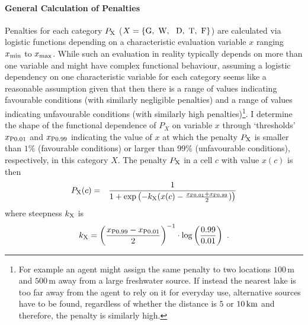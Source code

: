 \paragraph{General Calculation of Penalties}
Penalties for each category $P_{\rm X}$ ($X=\{\text{G,\, W, \, D,\, T,\, F}\}$) are calculated via logistic functions depending on a characteristic evaluation variable $x$ ranging $x_{\rm min}$ to $x_{\rm max}$.
While such an evaluation in reality typically depends on more than one variable and might have complex functional behaviour, assuming a logistic dependency on one characteristic variable for each category seems like a reasonable assumption given that then there is a range of values indicating favourable conditions (with similarly negligible penalties) and a range of values indicating unfavourable conditions (with similarly high penalties)\footnote{For example an agent might assign the same penalty to two locations $100\, \text{m}$ and $500\, \text{m}$ away from a large freshwater source. If instead the nearest lake is too far away from the agent to rely on it for everyday use, alternative sources have to be found, regardless of whether the distance is $5$ or $10\, {\rm km}$ and therefore, the penalty is similarly high.}.
I determine the shape of the functional dependence of $P_X$ on variable $x$ through `thresholds' $x_{\rm P0.01}$ and $x_{\rm P0.99}$ indicating the value of $x$ at which the penalty $P_{\rm X}$ is smaller than $1\%$ (favourable conditions) or larger than $99\%$ (unfavourable conditions), respectively, in this category $X$.
The penalty $P_{\rm X}$ in a cell $c$ with value $x(c)$ is then
\begin{eqnarray}\label{eq:P_X(c)}
	P_{\rm X}(c) & = & \frac{1}{1+\exp\left( - k_{\rm X} (x(c)-\frac{x_{\rm P0.01}+x_{\rm P0.99}}{2}) \right)} %
\end{eqnarray}
where steepness $k_{\rm X}$ is 
\begin{equation}\label{eq:k}
k_{\rm X} = \left(\frac{x_{\rm P0.99}-{x_{\rm P0.01}}}{2}\right)^{-1} \cdot \log\left(\frac{0.99}{0.01}\right) \ .
\end{equation}
